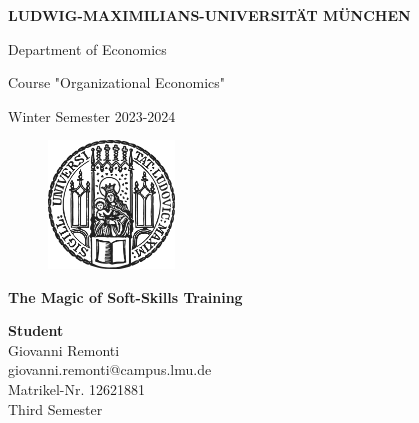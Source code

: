 \begin{titlepage}

\begin{center}
    {\large \uppercase{\textbf{Ludwig-Maximilians-Universität München}}}

    \vspace{0.5cm}
    
    {\Large Department of Economics}
    
    \vspace{0.5cm}

    {\Large Course "Organizational Economics"}

    \vspace{0.5cm}

    {\Large Winter Semester 2023-2024}
\end{center}

\vspace{0.7cm}

\begin{figure}[h]
    \centering
    \includegraphics[width=95pt]{img/lmu-logo.png}
\end{figure}

\begin{center}
    {\Large \textbf{The Magic of Soft-Skills Training}\par}
\end{center}

\vfill

\noindent\large \textbf{Student}\\
\large Giovanni Remonti\\
\large giovanni.remonti@campus.lmu.de\\
\large Matrikel-Nr. 12621881\\
\large Third Semester

\end{titlepage}